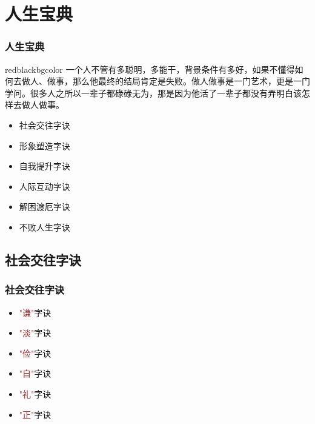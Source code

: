 \section{人生宝典}
\begin{frame}
\frametitle{人生宝典}
\begin{beamercolorbox}[rounded=true,shadow=true,wd=12cm]{redblackbgcolor}
    一个人不管有多聪明，多能干，背景条件有多好，如果不懂得如何去做人、做事，那么他最终的结局肯定是失败。做人做事是一门艺术，更是一门学问。很多人之所以一辈子都碌碌无为，那是因为他活了一辈子都没有弄明白该怎样去做人做事。
~\\
    \begin{itemize}
        \item 社会交往字诀
        \item 形象塑造字诀
        \item 自我提升字诀
        \item 人际互动字诀
        \item 解困渡厄字诀
        \item 不败人生字诀
    \end{itemize}
\end{beamercolorbox}
\end{frame}

\subsection{社会交往字诀}
\begin{frame}
\frametitle{社会交往字诀}
\begin{itemize}
    \item \textcolor{brown}{"谦"}字诀
    \item \textcolor{brown}{"淡"}字诀
    \item \textcolor{brown}{"俭"}字诀
    \item \textcolor{brown}{"自"}字诀
    \item \textcolor{brown}{"礼"}字诀
    \item \textcolor{brown}{"正"}字诀
\end{itemize}
\end{frame}

